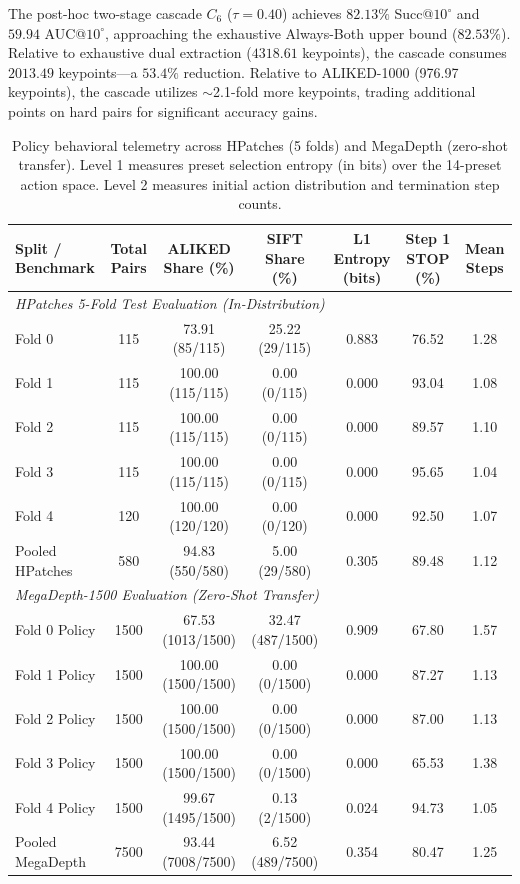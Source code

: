 \documentclass[conference]{IEEEtran}
\begin{document}
The post-hoc two-stage cascade $C_6$ ($\tau = 0.40$) achieves $82.13\%$ Succ@$10^\circ$ and $59.94$ AUC@$10^\circ$, approaching the exhaustive Always-Both upper bound ($82.53\%$). Relative to exhaustive dual extraction ($4318.61$ keypoints), the cascade consumes $2013.49$ keypoints---a $53.4\%$ reduction. Relative to ALIKED-1000 (976.97 keypoints), the cascade utilizes $\sim$2.1-fold more keypoints, trading additional points on hard pairs for significant accuracy gains.

\begin{table}[t]
\centering
\setlength{\tabcolsep}{4.0pt}
\footnotesize
\caption{Policy behavioral telemetry across HPatches (5 folds) and MegaDepth (zero-shot transfer). Level 1 measures preset selection entropy (in bits) over the 14-preset action space. Level 2 measures initial action distribution and termination step counts.}
\label{tab:policy_behaviour}
\begin{tabular}{lcccccc}
\hline
\textbf{Split / Benchmark} & \textbf{Total Pairs} & \textbf{ALIKED Share (\%)} & \textbf{SIFT Share (\%)} & \textbf{L1 Entropy (bits)} & \textbf{Step 1 STOP (\%)} & \textbf{Mean Steps} \\
\hline
\multicolumn{7}{l}{\textit{HPatches 5-Fold Test Evaluation (In-Distribution)}} \\
Fold 0 & 115 & 73.91 (85/115) & 25.22 (29/115) & 0.883 & 76.52 & 1.28 \\
Fold 1 & 115 & 100.00 (115/115) & 0.00 (0/115) & 0.000 & 93.04 & 1.08 \\
Fold 2 & 115 & 100.00 (115/115) & 0.00 (0/115) & 0.000 & 89.57 & 1.10 \\
Fold 3 & 115 & 100.00 (115/115) & 0.00 (0/115) & 0.000 & 95.65 & 1.04 \\
Fold 4 & 120 & 100.00 (120/120) & 0.00 (0/120) & 0.000 & 92.50 & 1.07 \\
Pooled HPatches & 580 & 94.83 (550/580) & 5.00 (29/580) & 0.305 & 89.48 & 1.12 \\
\hline
\multicolumn{7}{l}{\textit{MegaDepth-1500 Evaluation (Zero-Shot Transfer)}} \\
Fold 0 Policy & 1500 & 67.53 (1013/1500) & 32.47 (487/1500) & 0.909 & 67.80 & 1.57 \\
Fold 1 Policy & 1500 & 100.00 (1500/1500) & 0.00 (0/1500) & 0.000 & 87.27 & 1.13 \\
Fold 2 Policy & 1500 & 100.00 (1500/1500) & 0.00 (0/1500) & 0.000 & 87.00 & 1.13 \\
Fold 3 Policy & 1500 & 100.00 (1500/1500) & 0.00 (0/1500) & 0.000 & 65.53 & 1.38 \\
Fold 4 Policy & 1500 & 99.67 (1495/1500) & 0.13 (2/1500) & 0.024 & 94.73 & 1.05 \\
Pooled MegaDepth & 7500 & 93.44 (7008/7500) & 6.52 (489/7500) & 0.354 & 80.47 & 1.25 \\
\hline
\end{tabular}
\end{table}
\end{document}
